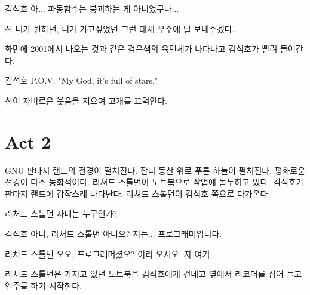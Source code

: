 \documentclass{screenplay}
\begin{document}
    
    \begin{dialogue}{김석호}
        아... 파동함수는 붕괴하는 게 아니었구나...
    \end{dialogue}
    
    \begin{dialogue}{신}
        니가 원하던, 니가 가고싶었던 그런 대체 우주에 널 보내주겠다.
    \end{dialogue}
    
    화면에 2001에서 나오는 것과 같은 검은색의 육면체가 나타나고 김석호가 빨려 들어간다.
    
    \begin{dialogue}{김석호}
        P.O.V. "My God, it's full of stars."
    \end{dialogue}
    
    신이 자비로운 웃음을 지으며 고개를 끄덕인다.
    
    \fadeout
    
    \section*{Act 2}
    
    \fadein
    
    
    GNU 판타지 랜드의 전경이 펼쳐진다. 잔디 동산 위로 푸른 하늘이 펼쳐진다. 평화로운 전경이 다소 동화적이다. 리쳐드 스톨먼이 노트북으로 작업에 몰두하고 있다. 김석호가 판타지 랜드에 갑작스레 나타난다. 리쳐드 스톨먼이 김석호 쪽으로 다가온다.
    
    \begin{dialogue}{리처드 스톨먼}
        자네는 누구인가?
    \end{dialogue}
    
    \begin{dialogue}{김석호}
        아니, 리처드 스톨먼 아니오? 저는... 프로그래머입니다.
    \end{dialogue}
    
    \begin{dialogue}{리처드 스톨먼}
        오오, 프로그래머셨오? 이리 오시오. 자 여기.
    \end{dialogue}
    
    리처드 스톨먼은 가지고 있던 노트북을 김석호에게 건네고 옆에서 리코더를 집어 들고 연주를 하기 시작한다.
    
\end{document}
